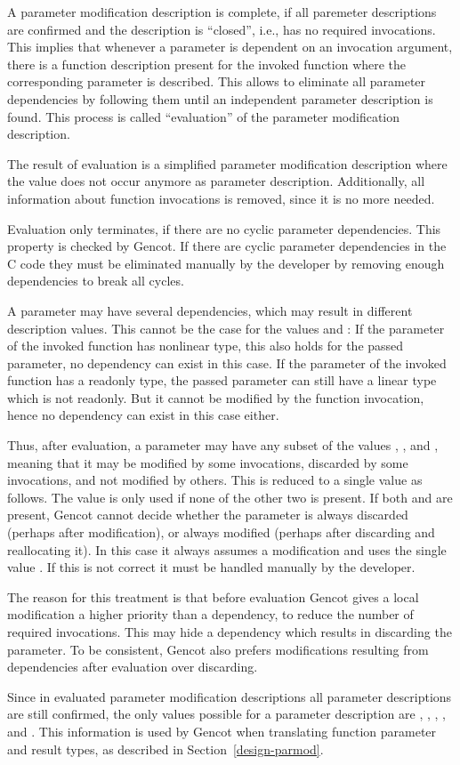A parameter modification description is complete, if all paremeter descriptions are confirmed and the description 
is ``closed'', i.e., has no required invocations. This implies that whenever a parameter is dependent on an invocation argument,
there is a function description present for the invoked function where the corresponding parameter is described.
This allows to eliminate all parameter dependencies by following them until an independent parameter description is found.
This process is called ``evaluation'' of the parameter modification description.

The result of evaluation is a simplified parameter modification description where the value  does not 
occur anymore as parameter description. Additionally, all information about function invocations is removed, since it is
no more needed.

Evaluation only terminates, if there are no cyclic parameter dependencies. This property is checked by Gencot. If there
are cyclic parameter dependencies in the C code they must be eliminated manually by the developer by removing enough dependencies 
to break all cycles.

A parameter may have several dependencies, which may result in different description values. This cannot be the case for
the values  and : If the parameter of the invoked function has nonlinear type, this
also holds for the passed parameter, no dependency can exist in this case. If the parameter of the invoked function has
a readonly type, the passed parameter can still have a linear type which is not readonly. But it cannot be modified by the
function invocation, hence no dependency can exist in this case either.

Thus, after evaluation, a parameter may have any subset of the values , , and , meaning 
that it may be modified by some invocations, discarded by some invocations, and not modified by others. This is reduced to
a single value as follows. The value  is only used if none of the other two is present. If both 
and  are present, Gencot cannot decide whether the parameter is always discarded (perhaps after modification),
or always modified (perhaps after discarding and reallocating it). In this case it always assumes a modification and
uses the single value . If this is not correct it must be handled manually by the developer.

The reason for this treatment is that before evaluation Gencot gives a local modification a higher priority than a dependency,
to reduce the number of required invocations. This may hide a dependency which results in discarding the parameter. To
be consistent, Gencot also prefers modifications resulting from dependencies after evaluation over discarding. 

Since in evaluated parameter modification descriptions all parameter descriptions are still confirmed, the only values
possible for a parameter description are , , , , and .
This information is used by Gencot when translating function parameter and result types, as described in Section~\ref{design-parmod}.
